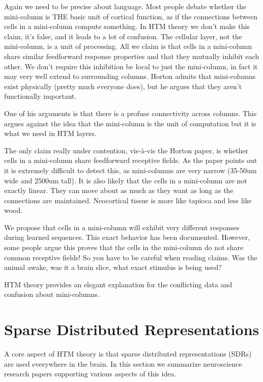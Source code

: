 \documentclass{article} %
\begin{document}
Again we need to be precise about language. Most people debate whether the
mini-column is THE  basic unit of cortical function, as if the connections
between cells in a mini-column compute something.  In HTM theory we don’t make
this claim, it’s false, and it leads to a lot of confusion.  The cellular layer,
not the mini-column, is a unit of processing. All we claim is that cells in a
mini-column share similar feedforward response properties and that they mutually
inhibit each other.  We don’t require this inhibition be local to just the
mini-column, in fact it may very well extend to surrounding columns.  Horton
admits that mini-columns exist physically (pretty much everyone does), but he
argues that they aren’t functionally important.

One of his arguments is that there is a profuse connectivity across columns.
This argues against the idea that the mini-column is the unit of computation but
it is what we need in HTM layers.

The only claim really under contention, vis-à-vis the Horton paper, is whether
cells in a mini-column share feedforward receptive fields.  As the paper points
out it is extremely difficult to detect this, as mini-columns are very narrow
(35-50um wide and 2500um tall).  It is also likely that the cells in a
mini-column are not exactly linear.  They can move about as much as they want as
long as the connections are maintained. Neocortical tissue is more like tapioca
and less like wood.

We propose that cells in a mini-column will exhibit very different responses
during learned sequences.  This exact behavior has been documented.  However,
some people argue this proves that the cells in the mini-column do not share
common receptive fields!  So you have to be careful when reading claims.  Was
the animal awake, was it a brain slice, what exact stimulus is being used?

HTM theory provides an elegant explanation for the conflicting data and
confusion about mini-columns.

\section{Sparse Distributed Representations}

A core aspect of HTM theory is that sparse distributed representations (SDRs)
are used everywhere in the brain. In this section we summarize neuroscience
research papers supporting various aspects of this idea.
\end{document}
